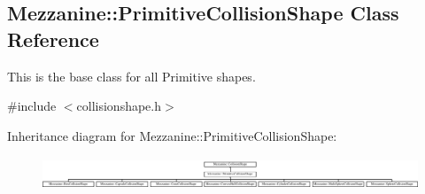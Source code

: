 \hypertarget{classMezzanine_1_1PrimitiveCollisionShape}{
\subsection{Mezzanine::PrimitiveCollisionShape Class Reference}
\label{classMezzanine_1_1PrimitiveCollisionShape}
}


This is the base class for all Primitive shapes.  




{\ttfamily \#include $<$collisionshape.h$>$}

Inheritance diagram for Mezzanine::PrimitiveCollisionShape:\begin{figure}[H]
\begin{center}
\leavevmode
\includegraphics[height=1.004184cm]{classMezzanine_1_1PrimitiveCollisionShape}
\end{center}
\end{figure}

